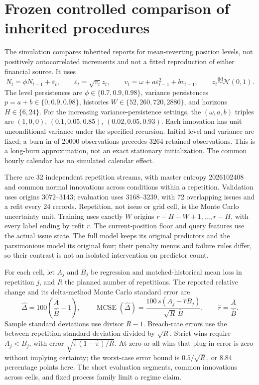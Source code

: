 \documentclass[11pt,a4paper]{article}
\begin{document}
\section{Frozen controlled comparison of inherited procedures}\label{sup:v8-mc}

The simulation compares inherited reports for mean-reverting position levels,
not positively autocorrelated increments and not a fitted reproduction of either
financial source. It uses
\[
N_t=\phi N_{t-1}+\varepsilon_t,\qquad
\varepsilon_t=\sqrt{v_t}z_t,\qquad
v_t=\omega+a\varepsilon_{t-1}^{2}+bv_{t-1},\qquad
z_t\stackrel{\mathrm{iid}}{\sim}\mathcal N(0,1).
\]
The level persistences are \(\phi\in\{0.7,0.9,0.98\}\), variance persistences
\(p=a+b\in\{0,0.9,0.98\}\), histories \(W\in\{52,260,720,2880\}\), and horizons
\(H\in\{6,24\}\). For the increasing variance-persistence settings, the
\((\omega,a,b)\) triples are \((1,0,0)\), \((0.1,0.05,0.85)\), \((0.02,0.05,0.93)\). Each innovation has unit unconditional
variance under the specified recursion. Initial level and variance are fixed;
a burn-in of 20000 observations precedes 3264 retained observations.
This is a long-burn approximation, not an exact stationary initialization.
The common hourly calendar has no simulated calendar effect.

There are 32 independent repetition streams, with master entropy 2026102408 and
common normal innovations across conditions within a repetition. Validation
uses origins 3072--3143; evaluation uses 3168--3239, with
72 overlapping issues and a refit every 24 records. Repetition, not
issue or grid cell, is the Monte Carlo uncertainty unit. Training uses exactly
\(W\) origins \(r-H-W+1,\ldots,r-H\), with every label ending by refit \(r\).
The current-position floor and query features use the actual issue state.
The full model keeps its original predictors and the parsimonious model its
original four; their penalty menus and failure rules differ, so their contrast
is not an isolated intervention on predictor count.

For each cell, let \(A_j\) and \(B_j\) be regression and matched-historical mean
loss in repetition \(j\), and \(R\) the planned number of repetitions. The
reported relative change and its delta-method Monte Carlo standard error are
\[
\widehat\Delta=100\left(\dfrac{\overline A}{\overline B}-1\right),\qquad
\operatorname{MCSE}(\widehat\Delta)=
\dfrac{100\,s(A_j-\widehat rB_j)}{\sqrt R\,\overline B},\qquad
\widehat r=\dfrac{\overline A}{\overline B}.
\]
Sample standard deviations use divisor \(R-1\). Breach-rate errors use the
between-repetition standard deviation divided by
\(\sqrt R\). Strict wins require \(A_j<B_j\), with error
\(\sqrt{\widehat\pi(1-\widehat\pi)/R}\). At zero or all wins that plug-in error is
zero without implying certainty; the worst-case error bound is
\(0.5/\sqrt R\), or 8.84 percentage points here. The short evaluation segments,
common innovations across cells, and fixed process family limit a regime claim.
\end{document}
